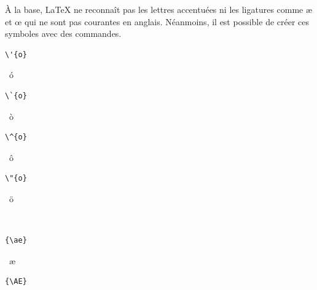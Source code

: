 {À la base, {\LaTeX} ne reconnaît pas les lettres accentuées ni les
ligatures comme {\ae} et {\oe} qui ne sont pas courantes en anglais.
Néanmoins, il est possible de créer ces symboles avec des commandes.
\begin{demo}
  \begin{minipage}{0.2\linewidth}
    \begin{texample}
\begin{lstlisting}
\'{o}
\end{lstlisting}
      \producing\ \'{o}
    \end{texample}
  \end{minipage}
  \hfill
  \begin{minipage}{0.2\linewidth}
    \begin{texample}
\begin{lstlisting}[escapeinside={}]
\`{o}
\end{lstlisting}
      \producing\ \`{o}
    \end{texample}
  \end{minipage}
  \hfill
  \begin{minipage}{0.2\linewidth}
    \begin{texample}
\begin{lstlisting}
\^{o}
\end{lstlisting}
      \producing\ \^{o}
    \end{texample}
  \end{minipage}
  \hfill
  \begin{minipage}{0.2\linewidth}
    \begin{texample}
\begin{lstlisting}
\"{o}
\end{lstlisting}
      \producing\ \"{o}
    \end{texample}
  \end{minipage} \\
  \hfill
  \begin{minipage}{0.2\linewidth}
    \begin{texample}
\begin{lstlisting}
{\ae}
\end{lstlisting}
      \producing\ \ae
    \end{texample}
  \end{minipage}
  \hfill
  \begin{minipage}{0.2\linewidth}
    \begin{texample}
\begin{lstlisting}
{\AE}
\end{lstlisting}

\end{texample}
\end{minipage}
\end{demo}}
